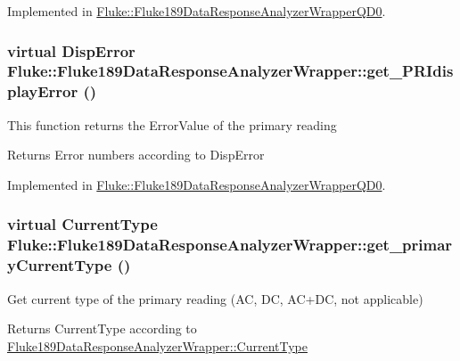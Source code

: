 Implemented in \hyperlink{classFluke_1_1Fluke189DataResponseAnalyzerWrapperQD0_ad28a17399ffe6a926990aafd5a1891d3}{Fluke::Fluke189DataResponseAnalyzerWrapperQD0}.\hypertarget{classFluke_1_1Fluke189DataResponseAnalyzerWrapper_ae6b5bf434d9600f4178650d66922a3aa}{
\subsubsection[{get\_\-PRIdisplayError}]{\setlength{\rightskip}{0pt plus 5cm}virtual {\bf DispError} Fluke::Fluke189DataResponseAnalyzerWrapper::get\_\-PRIdisplayError ()}}
\label{classFluke_1_1Fluke189DataResponseAnalyzerWrapper_ae6b5bf434d9600f4178650d66922a3aa}
This function returns the ErrorValue of the primary reading \begin{DoxyReturn}{Returns}
Error numbers according to DispError 
\end{DoxyReturn}


Implemented in \hyperlink{classFluke_1_1Fluke189DataResponseAnalyzerWrapperQD0_a92b0a7a3c0cfd671f86df8e8b61aebb8}{Fluke::Fluke189DataResponseAnalyzerWrapperQD0}.\hypertarget{classFluke_1_1Fluke189DataResponseAnalyzerWrapper_afb7361d6963bb0edd9194ba72a1583df}{
\subsubsection[{get\_\-primaryCurrentType}]{\setlength{\rightskip}{0pt plus 5cm}virtual {\bf CurrentType} Fluke::Fluke189DataResponseAnalyzerWrapper::get\_\-primaryCurrentType ()}}
\label{classFluke_1_1Fluke189DataResponseAnalyzerWrapper_afb7361d6963bb0edd9194ba72a1583df}
Get current type of the primary reading (AC, DC, AC+DC, not applicable) \begin{DoxyReturn}{Returns}
CurrentType according to \hyperlink{classFluke_1_1Fluke189DataResponseAnalyzerWrapper_afef24496da239e3613c40ad3582d7adc}{Fluke189DataResponseAnalyzerWrapper::CurrentType} 
\end{DoxyReturn}


